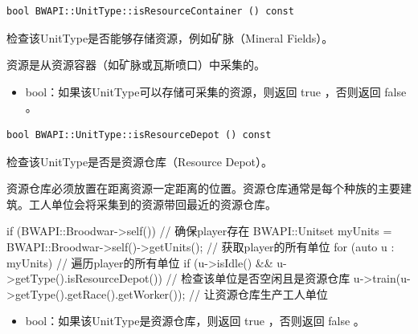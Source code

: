 \begin{tcolorbox}[colback=white, colframe=black!60!white, title=isResourceContainer(), arc=0mm]
    \begin{verbatim}
bool BWAPI::UnitType::isResourceContainer () const
    \end{verbatim}
    检查该UnitType是否能够存储资源，例如矿脉（Mineral Fields）。\par 资源是从资源容器（如矿脉或瓦斯喷口）中采集的。
\begin{return}
\begin{itemize}
    \item bool：如果该UnitType可以存储可采集的资源，则返回   true  ，否则返回   false  。
\end{itemize}
\end{return}
\end{tcolorbox}


\begin{tcolorbox}[colback=white, colframe=black!60!white, title=isResourceDepot(), arc=0mm]
    \begin{verbatim}
bool BWAPI::UnitType::isResourceDepot () const
    \end{verbatim}
    检查该UnitType是否是资源仓库（Resource Depot）。\par 资源仓库必须放置在距离资源一定距离的位置。资源仓库通常是每个种族的主要建筑。工人单位会将采集到的资源带回最近的资源仓库。
\begin{codebox}[示例代码]
if (BWAPI::Broodwar->self()) // 确保player存在
{
    BWAPI::Unitset myUnits = BWAPI::Broodwar->self()->getUnits(); // 获取player的所有单位
    for (auto u : myUnits) // 遍历player的所有单位
    {
        if (u->isIdle() && u->getType().isResourceDepot()) // 检查该单位是否空闲且是资源仓库
        {
            u->train(u->getType().getRace().getWorker()); // 让资源仓库生产工人单位
        }
    }
}
\end{codebox}
\begin{return}
\begin{itemize}
    \item bool：如果该UnitType是资源仓库，则返回   true  ，否则返回   false  。
\end{itemize}
\end{return}
\end{tcolorbox}


